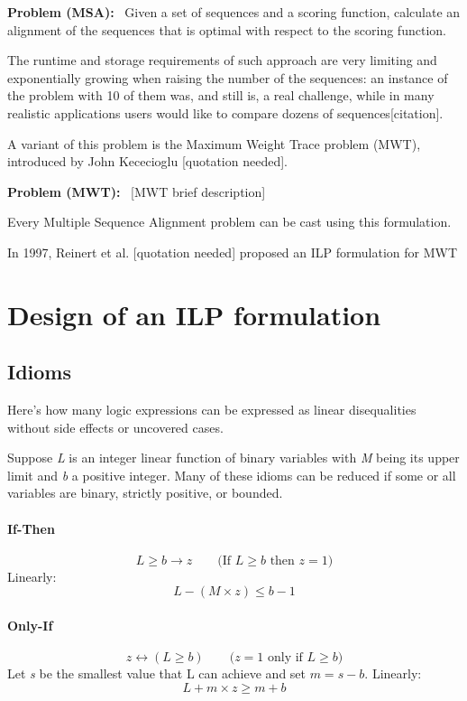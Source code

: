 \textbf{Problem (MSA):} \, Given a set of sequences and a scoring function, calculate an alignment of the sequences that is optimal with respect to the scoring function.

The runtime and storage requirements of such approach are very limiting and exponentially growing when raising the number of the sequences: an instance of the problem with 10 of them was, and still is, a real challenge, while in many realistic applications users would like to compare dozens of sequences[citation].

A variant of this problem is the Maximum Weight Trace problem (MWT), introduced by John Kececioglu [quotation needed].

\textbf{Problem (MWT):} \, [MWT brief description]


Every Multiple Sequence Alignment problem can be cast using this formulation.

In 1997, Reinert et al. [quotation needed] proposed an ILP formulation for MWT

\section{Design of an ILP formulation}

\subsection{Idioms}

Here's how many logic expressions can be expressed as linear disequalities without side effects or uncovered cases.

Suppose \textit{L} is an integer linear function of binary variables with \textit{M} being its upper limit and \textit{b} a positive integer. Many of these idioms can be reduced if some or all variables are binary, strictly positive, or bounded.

\paragraph{If-Then}

$$ L \geq b \rightarrow z \qquad \text{(If $L \geq  b $ then $z = 1$)}$$
Linearly:
$$ L - (M \times z) \leq  b - 1$$


\paragraph{Only-If}

$$z \leftrightarrow (L \geq b) \qquad \text{($z = 1$ only if $L \geq b$)}$$
Let \textit{s} be the smallest value that L can achieve and set $m = s - b$. Linearly:
$$ L + m \times z \geq m + b$$

